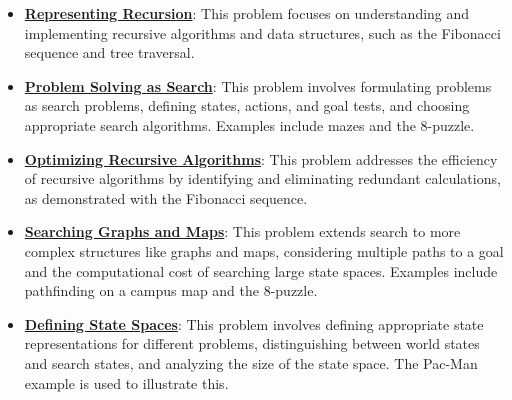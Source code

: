 \documentclass{article}%
\begin{document}
\begin{itemize}[leftmargin=*]%
\item \href{https://purdue.brightspace.com/d2l/common/assets/pdfjs-d2l-dist/1.0.14-legacy/web/viewer.html?file=\%2Fcontent\%2Fenforced\%2F1095467-wl.202510.CS.24300.001\%2F14L1-DepthFS.pdf\%3Fou\%3D1095467\&lang=en-us\&container=d2l-fileviewer-rendered-pdf\&fullscreen=d2l-fileviewer-rendered-pdf-dialog\&height=667#page=3}{\textbf{Representing Recursion}}: This problem focuses on understanding and implementing recursive algorithms and data structures, such as the Fibonacci sequence and tree traversal.%
\item \href{https://purdue.brightspace.com/d2l/common/assets/pdfjs-d2l-dist/1.0.14-legacy/web/viewer.html?file=\%2Fcontent\%2Fenforced\%2F1095467-wl.202510.CS.24300.001\%2F14L1-DepthFS.pdf\%3Fou\%3D1095467\&lang=en-us\&container=d2l-fileviewer-rendered-pdf\&fullscreen=d2l-fileviewer-rendered-pdf-dialog\&height=667#page=12}{\textbf{Problem Solving as Search}}: This problem involves formulating problems as search problems, defining states, actions, and goal tests, and choosing appropriate search algorithms. Examples include mazes and the 8-puzzle.%
\item \href{https://purdue.brightspace.com/d2l/common/assets/pdfjs-d2l-dist/1.0.14-legacy/web/viewer.html?file=\%2Fcontent\%2Fenforced\%2F1095467-wl.202510.CS.24300.001\%2F14L1-DepthFS.pdf\%3Fou\%3D1095467\&lang=en-us\&container=d2l-fileviewer-rendered-pdf\&fullscreen=d2l-fileviewer-rendered-pdf-dialog\&height=667#page=21}{\textbf{Optimizing Recursive Algorithms}}: This problem addresses the efficiency of recursive algorithms by identifying and eliminating redundant calculations, as demonstrated with the Fibonacci sequence.%
\item \href{https://purdue.brightspace.com/d2l/common/assets/pdfjs-d2l-dist/1.0.14-legacy/web/viewer.html?file=\%2Fcontent\%2Fenforced\%2F1095467-wl.202510.CS.24300.001\%2F14L1-DepthFS.pdf\%3Fou\%3D1095467\&lang=en-us\&container=d2l-fileviewer-rendered-pdf\&fullscreen=d2l-fileviewer-rendered-pdf-dialog\&height=667#page=25}{\textbf{Searching Graphs and Maps}}: This problem extends search to more complex structures like graphs and maps, considering multiple paths to a goal and the computational cost of searching large state spaces. Examples include pathfinding on a campus map and the 8-puzzle.%
\item \href{https://purdue.brightspace.com/d2l/common/assets/pdfjs-d2l-dist/1.0.14-legacy/web/viewer.html?file=\%2Fcontent\%2Fenforced\%2F1095467-wl.202510.CS.24300.001\%2F14L1-DepthFS.pdf\%3Fou\%3D1095467\&lang=en-us\&container=d2l-fileviewer-rendered-pdf\&fullscreen=d2l-fileviewer-rendered-pdf-dialog\&height=667#page=37}{\textbf{Defining State Spaces}}: This problem involves defining appropriate state representations for different problems, distinguishing between world states and search states, and analyzing the size of the state space. The Pac-Man example is used to illustrate this.%

\end{itemize}
\end{document}
